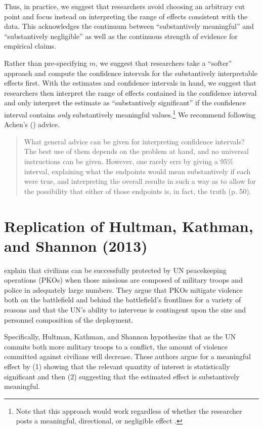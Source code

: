 \documentclass[12pt]{article}
\begin{document}
\noindent Thus, in practice, we suggest that researchers avoid choosing an arbitrary cut point and focus instead on interpreting the range of effects consistent with the data. This acknowledges the continuum between ``substantively meaningful'' and ``substantively negligible'' as well as the continuous strength of evidence for empirical claims. 

Rather than pre-specifying $m$, we suggest that researchers take a ``softer'' approach and compute the confidence intervals for the substantively interpretable effects first. With the estimates and confidence intervals in hand, we suggest that researchers then interpret the range of effects contained in the confidence interval and only interpret the estimate as ``substantively significant'' if the confidence interval contains \emph{only} substantively meaningful values.\footnote{Note that this approach would work regardless of whether the researcher posts a meaningful, directional, or negligible effect \citep{Rainey2014}.} We recommend following Achen's (\citeyear{Achen1982}) advice.

\begin{quote}
What general advice can be given for interpreting confidence intervals? The best use of them depends on the problem at hand, and no universal instructions can be given. However, one rarely errs by giving a 95\% interval, explaining what the endpoints would mean substantively if each were true, and interpreting the overall results in such a way as to allow for the possibility that either of those endpoints is, in fact, the truth (p. 50).
\end{quote}

\section*{Replication of Hultman, Kathman, and Shannon (2013)}

\cite{HultmanKathmanShannon2013} explain that civilians can be successfully protected by UN peacekeeping operations (PKOs) when those missions are composed of military troops and police in adequately large numbers. They argue that PKOs mitigate violence both on the battlefield and behind the battlefield's frontlines for a variety of reasons and that the UN's ability to intervene is contingent upon the size and personnel composition of the deployment.

Specifically, Hultman, Kathman, and Shannon hypothesize that as the UN commits both more military troops to a conflict, the amount of violence committed against civilians will decrease. These authors argue for a meaningful effect by (1) showing that the relevant quantity of interest is statistically significant and then (2) suggesting that the estimated effect is substantively meaningful.
\end{document}
